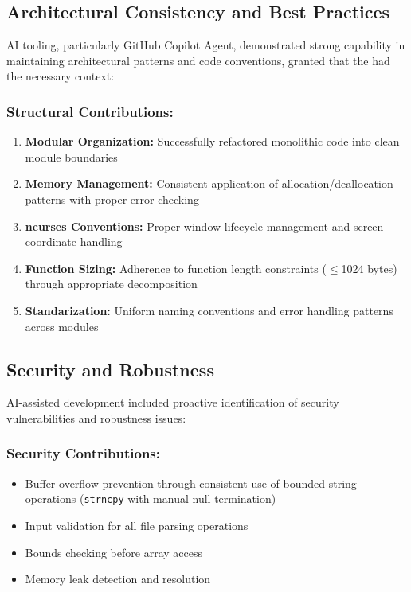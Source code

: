 \documentclass[12pt,a4paper]{article}
\begin{document}
\subsection{Architectural Consistency and Best Practices}

AI tooling, particularly GitHub Copilot Agent, demonstrated strong capability in maintaining architectural patterns and code conventions, granted that the had the necessary context:

\subsubsection*{Structural Contributions:}
\begin{enumerate}
    \item \textbf{Modular Organization:} Successfully refactored monolithic code into clean module boundaries
    \item \textbf{Memory Management:} Consistent application of allocation/deallocation patterns with proper error checking
    \item \textbf{ncurses Conventions:} Proper window lifecycle management and screen coordinate handling
    \item \textbf{Function Sizing:} Adherence to function length constraints ($\leq$1024 bytes) through appropriate decomposition
    \item \textbf{Standarization:} Uniform naming conventions and error handling patterns across modules
\end{enumerate}

\subsection{Security and Robustness}

AI-assisted development included proactive identification of security vulnerabilities and robustness issues:

\subsubsection*{Security Contributions:}
\begin{itemize}
    \item Buffer overflow prevention through consistent use of bounded string operations (\texttt{strncpy} with manual null termination)
    \item Input validation for all file parsing operations
    \item Bounds checking before array access
    \item Memory leak detection and resolution
\end{itemize}
\end{document}
